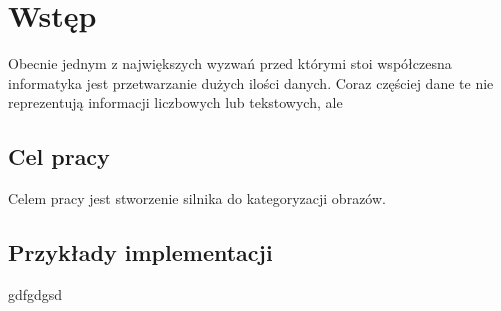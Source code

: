 \chapter*{Wstęp}
Obecnie jednym z największych wyzwań przed którymi stoi współczesna informatyka jest przetwarzanie dużych ilości danych. Coraz częściej dane te nie reprezentują informacji liczbowych lub tekstowych, ale 

\section*{Cel pracy}
Celem pracy jest stworzenie silnika do kategoryzacji obrazów.

\section*{Przykłady implementacji}
gdfgdgsd